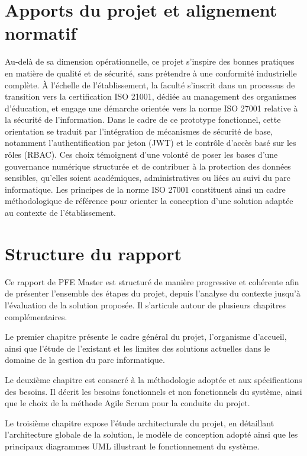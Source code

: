 \section*{Apports du projet et alignement normatif}
\label{sec:signification_projet}

Au-delà de sa dimension opérationnelle, ce projet s’inspire des bonnes pratiques en matière de qualité et de sécurité, sans prétendre à une conformité industrielle complète. À l’échelle de l’établissement, la faculté s’inscrit dans un processus de transition vers la certification ISO 21001, dédiée au management des organismes d’éducation, et engage une démarche orientée vers la norme ISO 27001 relative à la sécurité de l’information. Dans le cadre de ce prototype fonctionnel, cette orientation se traduit par l’intégration de mécanismes de sécurité de base, notamment l’authentification par jeton (JWT) et le contrôle d’accès basé sur les rôles (RBAC). Ces choix témoignent d’une volonté de poser les bases d’une gouvernance numérique structurée et de contribuer à la protection des données sensibles, qu’elles soient académiques, administratives ou liées au suivi du parc informatique. Les principes de la norme ISO 27001 constituent ainsi un cadre méthodologique de référence pour orienter la conception d’une solution adaptée au contexte de l’établissement.

\section*{Structure du rapport}
\label{sec:structure_rapport}

Ce rapport de PFE Master est structuré de manière progressive et cohérente afin de présenter l’ensemble des étapes du projet, depuis l’analyse du contexte jusqu’à l’évaluation de la solution proposée. Il s’articule autour de plusieurs chapitres complémentaires.

Le premier chapitre présente le cadre général du projet, l’organisme d’accueil, ainsi que l’étude de l’existant et les limites des solutions actuelles dans le domaine de la gestion du parc informatique.

Le deuxième chapitre est consacré à la méthodologie adoptée et aux spécifications des besoins. Il décrit les besoins fonctionnels et non fonctionnels du système, ainsi que le choix de la méthode Agile Scrum pour la conduite du projet.

Le troisième chapitre expose l’étude architecturale du projet, en détaillant l’architecture globale de la solution, le modèle de conception adopté ainsi que les principaux diagrammes UML illustrant le fonctionnement du système.

